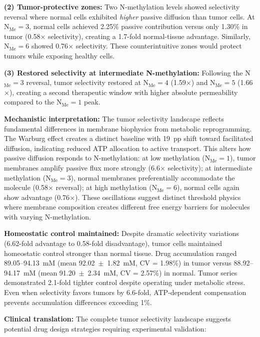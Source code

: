 \documentclass[10pt,letterpaper]{article}
\begin{document}
\textbf{(2) Tumor-protective zones:} Two N-methylation levels showed selectivity reversal where normal cells exhibited \textit{higher} passive diffusion than tumor cells. At N$_{\text{Me}} = 3$, normal cells achieved 2.25\% passive contribution versus only 1.30\% in tumor (0.58$\times$ selectivity), creating a 1.7-fold normal-tissue advantage. Similarly, N$_{\text{Me}} = 6$ showed 0.76$\times$ selectivity. These counterintuitive zones would protect tumors while exposing healthy cells.

\textbf{(3) Restored selectivity at intermediate N-methylation:} Following the N$_{\text{Me}} = 3$ reversal, tumor selectivity restored at N$_{\text{Me}} = 4$ (1.59$\times$) and N$_{\text{Me}} = 5$ (1.66$\times$), creating a second therapeutic window with higher absolute permeability compared to the N$_{\text{Me}} = 1$ peak.

\textbf{Mechanistic interpretation:} The tumor selectivity landscape reflects fundamental differences in membrane biophysics from metabolic reprogramming. The Warburg effect creates a distinct baseline with 19~pp shift toward facilitated diffusion, indicating reduced ATP allocation to active transport. This alters how passive diffusion responds to N-methylation: at low methylation (N$_{\text{Me}} = 1$), tumor membranes amplify passive flux more strongly (6.6$\times$ selectivity); at intermediate methylation (N$_{\text{Me}} = 3$), normal membranes preferentially accommodate the molecule (0.58$\times$ reversal); at high methylation (N$_{\text{Me}} = 6$), normal cells again show advantage (0.76$\times$). These oscillations suggest distinct threshold physics where membrane composition creates different free energy barriers for molecules with varying N-methylation.

\textbf{Homeostatic control maintained:} Despite dramatic selectivity variations (6.62-fold advantage to 0.58-fold disadvantage), tumor cells maintained homeostatic control stronger than normal tissue. Drug accumulation ranged 89.05--94.13~mM (mean 92.02~$\pm$~1.82~mM, CV = 1.98\%) in tumor versus 88.92--94.17~mM (mean 91.20~$\pm$~2.34~mM, CV = 2.57\%) in normal. Tumor series demonstrated 2.1-fold tighter control despite operating under metabolic stress. Even when selectivity favors tumors by 6.6-fold, ATP-dependent compensation prevents accumulation differences exceeding 1\%.

\textbf{Clinical translation:} The complete tumor selectivity landscape suggests potential drug design strategies requiring experimental validation:
\end{document}
